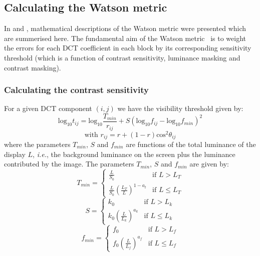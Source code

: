 \documentclass[12pt]{report}
\begin{document}
\subsection{Calculating the Watson metric}
In \cite{volo2nd} and \cite{mayacheDI}, mathematical descriptions of the Watson
metric were presented which are summerised here. The fundamental aim of the Watson
metric~\cite{watsonmetric} is to weight the errors for each DCT coefficient in each
block by its corresponding sensitivity threshold (which is a function of
contrast sensitivity, luminance masking and contrast masking).

\subsubsection{Calculating the contrast sensitivity}
For a given DCT component $(i,j)$ we have the visibility threshold given by:
\begin{equation}
\mbox{log}_{10}t_{ij}=\mbox{log}_{10}\frac{T_{min}}{r_{ij}}+
	S(\mbox{log}_{10}f_{ij}-\mbox{log}_{10}f_{min})^{2} 
\end{equation}
\begin{equation}
\mbox{with~}r_{ij}=r+(1-r)\mbox{cos}^{2}\theta_{ij}
\end{equation}
where the parameters $T_{min}$, $S$ and $f_{min}$ are functions of the total
luminance of the display $L$, \emph{i.e.}, the background luminance on the
screen plus the luminance contributed by the image. The parameters
$T_{min}$, $S$ and $f_{min}$ are given by:
\begin{equation}
	T_{min}=
	\left\{ \begin{array}{ll}
		\frac{L}{S_{0}}		&	\mbox{if~} L > L_{T} \\	
		\frac{L}{S_{0}} \left(\frac{L_{T}}{L}\right)^{1-a_{t}}	& \mbox{if~} L \leq L_{T}
	\end{array}\right.
\end{equation}
\begin{equation}
S=
	\left\{ \begin{array}{ll}
		k_{0}		& 	\mbox{if~} L > L_{k} \\
		k_{0} \left(\frac{L}{L_{k}}\right)^{a_{k}} 	& \mbox{if~} L \leq L_{k}
	\end{array}\right.
\end{equation}
\begin{equation}
f_{min}=
	\left\{ \begin{array}{ll}
		f_{0}		& 	\mbox{if~} L > L_{f}	\\
		f_{0} \left(\frac{L}{L_{f}}\right)^{a_{f}}	& \mbox{if~} L \leq L_{f}
	\end{array} \right.
\end{equation}
\end{document}
